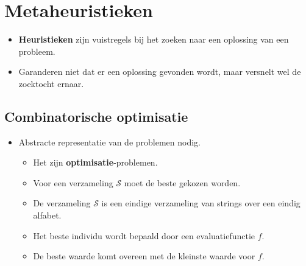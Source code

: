 \chapter{Metaheuristieken}
\begin{itemize}
    \item \textbf{Heuristieken} zijn vuistregels bij het zoeken naar een oplossing van een probleem.
    \item Garanderen niet dat er een oplossing gevonden wordt, maar versnelt wel de zoektocht ernaar.
\end{itemize}

\section{Combinatorische optimisatie}
\begin{itemize}
    \item Abstracte representatie van de problemen nodig. 
    \begin{itemize}
        \item Het zijn \textbf{optimisatie}-problemen.
        \item Voor een verzameling $\mathcal{S}$ moet de beste gekozen worden.
        \item De verzameling $\mathcal{S}$ is een eindige verzameling van strings over een eindig alfabet.
        \item Het beste individu wordt bepaald door een evaluatiefunctie $f$.
        \item De beste waarde komt overeen met de kleinste waarde voor $f$.
    \end{itemize}
\end{itemize}
